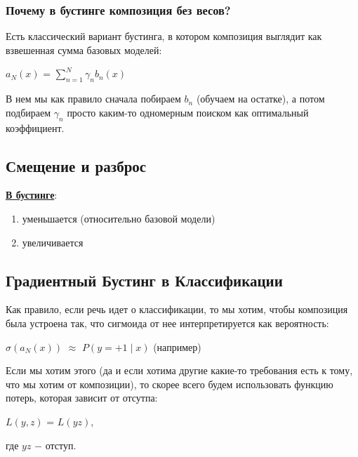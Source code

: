         \subsubsection{Почему в бустинге композиция без весов?}

            Есть классический вариант бустинга, в котором композиция выглядит как взвешенная сумма базовых моделей:
            \begin{center}
                $a_{N}(x)$ = $\sum\limits_{n = 1}^N \gamma_nb_n(x)$
            \end{center}
            В нем мы как правило сначала побираем $b_n$ (обучаем на остатке), а потом подбираем $\gamma_n$ просто каким-то одномерным поиском как оптимальный коэффициент.\\
            


    \subsection{Смещение и разброс}

        \underline{\textbf{В бустинге}}:
        \begin{enumerate}
            \item {} уменьшается (относительно базовой модели)

            \item {} увеличивается
        \end{enumerate}



    \subsection{Градиентный Бустинг в Классификации}

        Как правило, если речь идет о классификации, то мы хотим, чтобы композиция была устроена так, что сигмоида от нее интерпретируется как вероятность:
        \begin{center}
            $\sigma(a_N(x))$ $\approx$ $P(y = +1 \mid x)$ \quad (например)
        \end{center}
        Если мы хотим этого (да и если хотима другие какие-то требования есть к тому, что мы хотим от композиции), то скорее всего будем использовать функцию потерь, которая зависит от отсутпа:
        \begin{center}
            $L(y, z)$ = $L(yz)$,
        \end{center}
        где $yz$ $-$ отступ.\\


